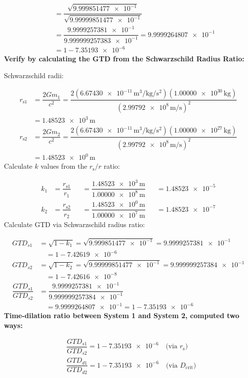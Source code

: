 \documentclass[twoside,twocolumn,9pt,fleqn]{article}
\begin{document}
\begin{mdframed}
\begin{align*}
&\quad = \dfrac{\sqrt{\num{9.999851477e-1}}}{\sqrt{\num{9.99999851477e-1}}}\\
&\quad = \dfrac{\num{9.9999257381e-1}}{\num{9.999999257383e-1}} = \num{9.9999264807e-1}\\
&\quad = 1-\num{7.35193e-6}
\end{align*}
\noindent\textbf{Verify by calculating the GTD from the Schwarzschild Radius Ratio:}\par
\noindent Schwarzschild radii:\par
\begin{align*}
r_{\mathrm{s}1} &= \dfrac{2Gm_1}{c^2} = \dfrac{2(\num{6.67430e-11}\,\unit{\meter\cubed\per\kilogram\per\second\squared})(\num{1.00000e30}\,\unit{\kilogram})}{(\num{2.99792e8}\,\unit{\meter\per\second})^2}\\
&= \num{1.48523e3}\,\unit{\meter}\\
r_{\mathrm{s}2} &= \dfrac{2Gm_2}{c^2} = \dfrac{2(\num{6.67430e-11}\,\unit{\meter\cubed\per\kilogram\per\second\squared})(\num{1.00000e27}\,\unit{\kilogram})}{(\num{2.99792e8}\,\unit{\meter\per\second})^2}\\
&= \num{1.48523e0}\,\unit{\meter}
\end{align*}
\noindent Calculate $k$ values from the $r_{\mathrm{s}}/r$ ratio:\par
\begin{align*}
k_1 &= \dfrac{r_{\mathrm{s}1}}{r_1} &&= \dfrac{\num{1.48523e3}\,\unit{\meter}}{\num{1.00000e8}\,\unit{\meter}} &&= \num{1.48523e-5}\\
k_2 &= \dfrac{r_{\mathrm{s}2}}{r_2} &&= \dfrac{\num{1.48523e0}\,\unit{\meter}}{\num{1.00000e7}\,\unit{\meter}} &&= \num{1.48523e-7}
\end{align*}
\noindent Calculate GTD via Schwarzschild radius ratio:\par
\begin{align*}
GTD_{s1} &= \sqrt{1-k_1} = \sqrt{\num{9.999851477e-1}} = \num{9.9999257381e-1}\\
&\quad = 1-\num{7.42619e-6}\\
GTD_{s2} &= \sqrt{1-k_2} = \sqrt{\num{9.99999851477e-1}} = \num{9.999999257384e-1}\\
&\quad = 1-\num{7.42616e-8}\\
\dfrac{GTD_{s1}}{GTD_{s2}} &= \dfrac{\num{9.9999257381e-1}}{\num{9.999999257384e-1}}\\
&\quad = \num{9.9999264807e-1} = 1-\num{7.35193e-6}
\end{align*}
\noindent\textbf{Time-dilation ratio between System 1 and System 2, computed two ways:}\par
\begin{align*}
&\dfrac{GTD_{s1}}{GTD_{s2}} = 1-\num{7.35193e-6} \quad \text{(via $r_{\mathrm{s}}$)}\\
&\dfrac{GTD_{d1}}{GTD_{d2}} = 1-\num{7.35193e-6} \quad \text{(via $D_{\mathrm{crit}}$)}
\end{align*}
\end{mdframed}
\end{document}
